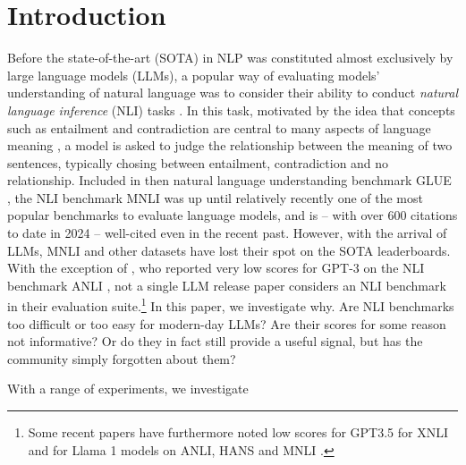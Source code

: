 \section{Introduction}

Before the state-of-the-art (SOTA) in NLP was constituted almost exclusively by large language models (LLMs), a popular way of evaluating models' understanding of natural language was to consider their ability to conduct \emph{natural language inference} (NLI) tasks \citep[most famously,][]{bowman-etal-2015-large,williams-etal-2018-broad}.
In this task, motivated by the idea that concepts such as entailment and contradiction are central to many aspects of language meaning \citep{bowman-etal-2015-large},  a model is asked to judge the relationship between the meaning of two sentences, typically chosing between entailment, contradiction and no relationship.
Included in then natural language understanding benchmark GLUE \citep{wang2019glue}, the NLI benchmark MNLI \citep{williams-etal-2018-broad} was up until relatively recently one of the most popular benchmarks to evaluate language models, and is -- with over 600 citations to date in 2024 -- well-cited even in the recent past.
However, with the arrival of LLMs, MNLI and other datasets have lost their spot on the SOTA leaderboards.
With the exception of \citet{brown2020languagemodelsfewshotlearners},  who reported very low scores for GPT-3 on the NLI benchmark ANLI \citep{nie-etal-2020-adversarial}, not a single LLM release paper considers an NLI benchmark in their evaluation suite.\footnote{Some recent papers have furthermore noted low scores for GPT3.5 for XNLI \citep{ohmer2024form,ohmer-etal-2023-separating} and for Llama 1 models on ANLI, HANS \citep{mccoy-etal-2019-right} and MNLI \citep{weber-etal-2023-mind}.}
In this paper, we investigate why.
Are NLI benchmarks too difficult or too easy for modern-day LLMs?
Are their scores for some reason not informative?
Or do they in fact still provide a useful signal, but has the community simply forgotten about them?

With a range of experiments, we investigate 


